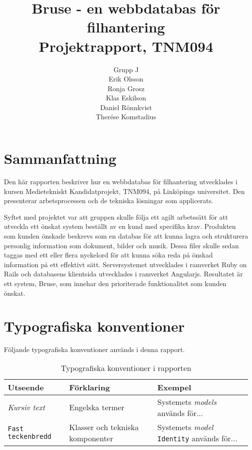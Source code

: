 \documentclass[a4paper,12pt,oneside,final]{extbook}
\title{Bruse - en webbdatabas för filhantering\\Projektrapport, TNM094}
\author{Grupp J\\Erik Olsson\\Ronja Grosz\\Klas Eskilson\\Daniel Rönnkvist\\Therése Komstadius}
\begin{document}
\pagestyle{empty}
\thispagestyle{empty}

\frontmatter

\maketitle

\pagestyle{fancy}

\chapter{Sammanfattning}
Den här rapporten beskriver hur en webbdatabas för filhantering utvecklades i kursen Medietekniskt Kandidatprojekt, TNM094, på Linköpings universitet. Den presenterar arbetsprocessen och de tekniska lösningar som applicerats. 

Syftet med projektet var att gruppen skulle följa ett agilt arbetssätt för att utveckla ett önskat system beställt av en kund med specifika krav. Produkten som kunden önskade beskrevs som en databas för att kunna lagra och strukturera personlig information som dokument, bilder och musik. Dessa filer skulle sedan taggas med ett eller flera nyckelord för att kunna söka reda på önskad information på ett effektivt sätt. Serversystemet utvecklades i ramverket Ruby on Rails och databasens klientsida utvecklades i ramverket Angularjs. Resultatet är ett system, Bruse, som innehar den prioriterade funktionalitet som kunden önskat. 

\tableofcontents

\cleardoublepage
{}
\listoffigures

\cleardoublepage
{}
\listoftables

\chapter{Typografiska konventioner}
Följande typografiska konventioner används i denna rapport.

\begin{table}[h]
  \begin{centering}
    \begin{tabular}{|l|l|l|}
    \hline
    \textbf{Utseende} & \textbf{Förklaring} & \textbf{Exempel} \\
    \hline
    \emph{Kursiv text} & Engelska termer & Systemets \emph{models} används för... \\
    \hline
    \texttt{Fast teckenbredd} & Klasser och tekniska komponenter & Systemets \emph{model} \texttt{Identity} används för... \\
    \hline
    \end{tabular}
    \caption[Table caption text]{Typografiska konventioner i rapporten}
    \label{table:type}
  \end{centering}
\end{table}
\end{document}
